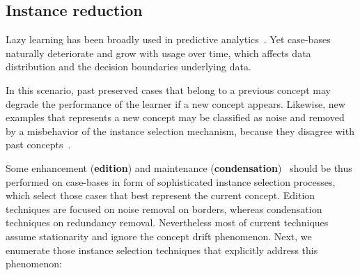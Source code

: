\documentclass[preprint,12pt]{elsarticle}
\begin{document}
\subsection{Instance reduction}
\label{subsec:isel}

Lazy learning has been broadly used in predictive analytics~\cite{cover67}. Yet case-bases naturally deteriorate and grow with usage over time, which affects data distribution and the decision boundaries underlying data.

In this scenario, past preserved cases that belong to a previous concept may degrade the performance of the learner if a new concept appears. Likewise, new examples that represents a new concept may be classified as noise and removed by a misbehavior of the instance selection mechanism, because they disagree with past concepts~\cite{lu16}. 

Some enhancement (\textbf{edition}) and maintenance (\textbf{condensation})~\cite{garcia14} should be thus performed on case-bases in form of sophisticated instance selection processes, which select those cases that best represent the current concept. Edition techniques are focused on noise removal on borders, whereas condensation techniques on redundancy removal. Nevertheless most of current techniques assume stationarity and ignore the concept drift phenomenon. Next, we enumerate those instance selection techniques that explicitly address this phenomenon:
\end{document}
